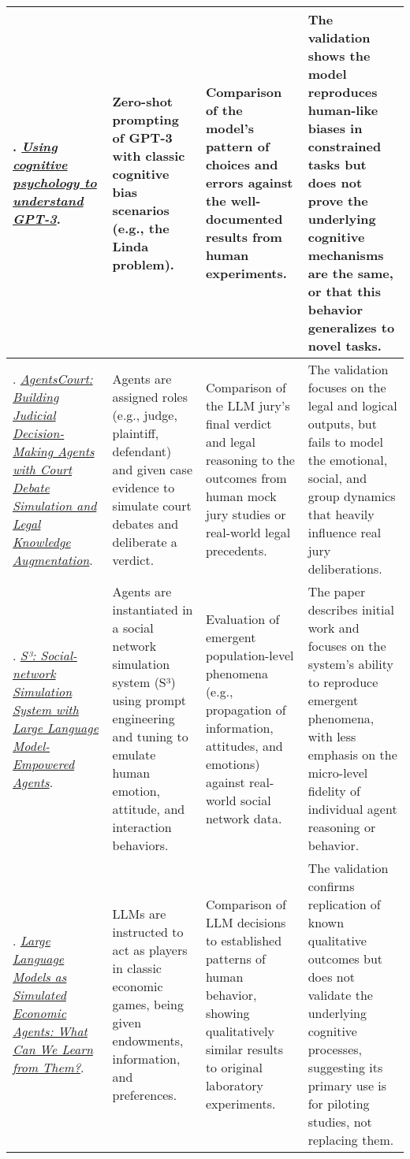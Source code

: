 {\begin{longtable}{| L{4.5cm} | L{3.5cm} | L{3.5cm} | L{3.5cm} |}
\citet{binz2023using}. \href{https://doi.org/10.1073/pnas.2218523120}{\textit{Using cognitive psychology to understand GPT-3}}. & Zero-shot prompting of GPT-3 with classic cognitive bias scenarios (e.g., the Linda problem). & Comparison of the model's pattern of choices and errors against the well-documented results from human experiments. & The validation shows the model reproduces human-like biases in constrained tasks but does not prove the underlying cognitive mechanisms are the same, or that this behavior generalizes to novel tasks.
\\\hline
\citet{he2024agentscourt}. \href{https://arxiv.org/abs/2403.02959}{\textit{AgentsCourt: Building Judicial Decision-Making Agents with Court Debate Simulation and Legal Knowledge Augmentation}}. & Agents are assigned roles (e.g., judge, plaintiff, defendant) and given case evidence to simulate court debates and deliberate a verdict. & Comparison of the LLM jury's final verdict and legal reasoning to the outcomes from human mock jury studies or real-world legal precedents. & The validation focuses on the legal and logical outputs, but fails to model the emotional, social, and group dynamics that heavily influence real jury deliberations.
\\\hline
\citet{gao2023s3}. \href{https://arxiv.org/abs/2307.14984}{\textit{S³: Social-network Simulation System with Large Language Model-Empowered Agents}}. & Agents are instantiated in a social network simulation system (S³) using prompt engineering and tuning to emulate human emotion, attitude, and interaction behaviors. & Evaluation of emergent population-level phenomena (e.g., propagation of information, attitudes, and emotions) against real-world social network data. & The paper describes initial work and focuses on the system's ability to reproduce emergent phenomena, with less emphasis on the micro-level fidelity of individual agent reasoning or behavior.
\\\hline
\citet{horton2023large}. \href{https://www.nber.org/papers/w31122}{\textit{Large Language Models as Simulated Economic Agents: What Can We Learn from Them?}}. & LLMs are instructed to act as players in classic economic games, being given endowments, information, and preferences. & Comparison of LLM decisions to established patterns of human behavior, showing qualitatively similar results to original laboratory experiments. & The validation confirms replication of known qualitative outcomes but does not validate the underlying cognitive processes, suggesting its primary use is for piloting studies, not replacing them.

\end{longtable}}

